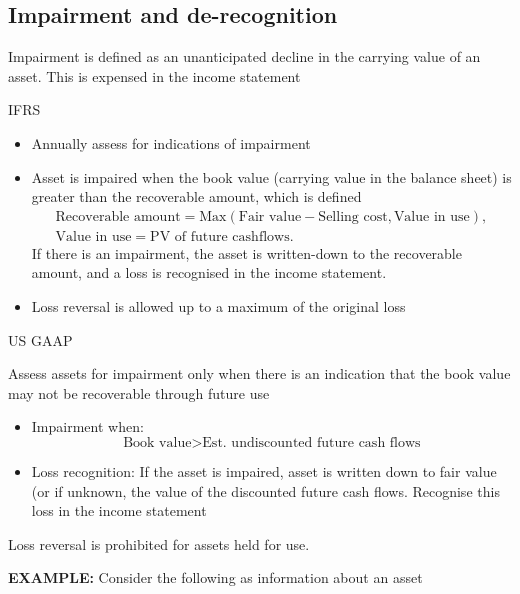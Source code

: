 \documentclass[../notes_compiled.tex]{subfiles}
\begin{document}
\subsection{Impairment and de-recognition}
\begin{itemize}
\item Impairment is defined as an unanticipated decline in the carrying value of an asset. This is expensed in the income statement
\item IFRS
\begin{itemize}
\item Annually assess for indications of impairment
\item Asset is impaired when the book value (carrying value in the balance sheet) is greater than the recoverable amount, which is defined
\begin{gather}
\text{Recoverable amount} = \text{Max}(\text{Fair value} - \text{Selling cost}, \text{Value in use}), \\
\text{Value in use} = \text{PV of future cashflows}.
\end{gather}
If there is an impairment, the asset is written-down to the recoverable amount, and a loss is recognised in the income statement.
\item Loss reversal is allowed up to a maximum of the original loss
\end{itemize}

\item{US GAAP}
\begin{itemize}
\item Assess assets for impairment only when there is an indication that the book value may not be recoverable through future use
\begin{itemize}
\item Impairment when: 
\begin{equation*}
\text{Book value} > \text{Est. undiscounted future cash flows}
\end{equation*}
\item Loss recognition: If the asset is impaired, asset is written down to fair value (or if unknown, the value of the discounted future cash flows. Recognise this loss in the income statement
\end{itemize}
\item Loss reversal is prohibited for assets held for use.

{\color{RedViolet}
\item[] \textbf{EXAMPLE:} Consider the following as information about an asset

}
\end{itemize}
\end{itemize}
\end{document}
